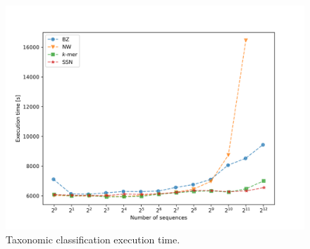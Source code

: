 \documentclass{article}
\begin{document}
                \begin{figure}[!htb]
                    \begin{center}
                        \includegraphics[width=\textwidth]{pictures/experiment_duration.png}
                    \end{center}
                    \caption{
                        Taxonomic classification execution time.
                    }\label{Picture:Experiment:Duration}
                \end{figure}
\end{document}
